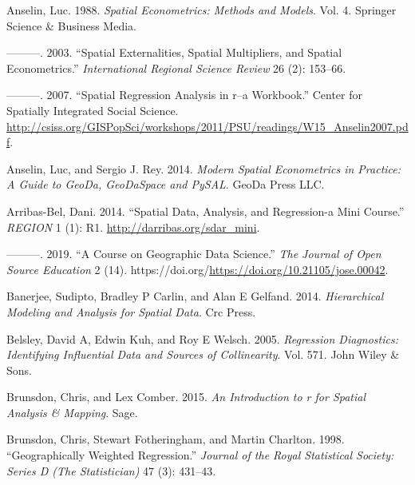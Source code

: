 \documentclass[
  letterpaper,
  krantz2]{style/krantz}
\newlength{\cslhangindent}
\newlength{\cslentryspacingunit} %
\newenvironment{CSLReferences}[2] %
 {%
  \setlength{\parindent}{0pt}
  \ifodd #1
  \let\oldpar\par
  \def\par{\hangindent=\cslhangindent\oldpar}
  \fi
  \setlength{\parskip}{#2\cslentryspacingunit}
 }%
 {}
\begin{document}
\hypertarget{refs}{}
\begin{CSLReferences}{1}{0}
\leavevmode{}%
Anselin, Luc. 1988. \emph{Spatial Econometrics: Methods and Models}.
Vol. 4. Springer Science \& Business Media.

\leavevmode{}%
---------. 2003. {``Spatial Externalities, Spatial Multipliers, and
Spatial Econometrics.''} \emph{International Regional Science Review} 26
(2): 153--66.

\leavevmode{}%
---------. 2007. {``Spatial Regression Analysis in r--a Workbook.''}
Center for Spatially Integrated Social Science.
\url{http://csiss.org/GISPopSci/workshops/2011/PSU/readings/W15_Anselin2007.pdf}.

\leavevmode{}%
Anselin, Luc, and Sergio J. Rey. 2014. \emph{Modern Spatial Econometrics
in Practice: A Guide to GeoDa, GeoDaSpace and PySAL}. GeoDa Press LLC.

\leavevmode{}%
Arribas-Bel, Dani. 2014. {``Spatial Data, Analysis, and Regression-a
Mini Course.''} \emph{REGION} 1 (1): R1.
\url{http://darribas.org/sdar_mini}.

\leavevmode{}%
---------. 2019. {``A Course on Geographic Data Science.''} \emph{The
Journal of Open Source Education} 2 (14).
https://doi.org/\url{https://doi.org/10.21105/jose.00042}.

\leavevmode{}%
Banerjee, Sudipto, Bradley P Carlin, and Alan E Gelfand. 2014.
\emph{Hierarchical Modeling and Analysis for Spatial Data}. Crc Press.

\leavevmode{}%
Belsley, David A, Edwin Kuh, and Roy E Welsch. 2005. \emph{Regression
Diagnostics: Identifying Influential Data and Sources of Collinearity}.
Vol. 571. John Wiley \& Sons.

\leavevmode{}%
Brunsdon, Chris, and Lex Comber. 2015. \emph{An Introduction to r for
Spatial Analysis \& Mapping}. Sage.

\leavevmode{}%
Brunsdon, Chris, Stewart Fotheringham, and Martin Charlton. 1998.
{``Geographically Weighted Regression.''} \emph{Journal of the Royal
Statistical Society: Series D (The Statistician)} 47 (3): 431--43.


\end{CSLReferences}
\end{document}
